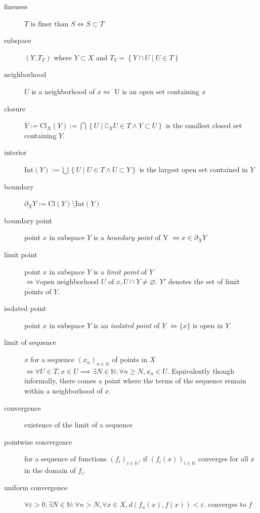 \documentclass[tbtags,columns=2]{cheatsheet}
\begin{document}
\begin{description}
    \item[fineness] $T\text{ is finer than }S \iff S \subset T$
    \item[subspace] $(Y,T_Y)$ where $Y\subset X$ and $T_Y = \left\{ Y \cap U \mid U \in T\right\}$
    \item[neighborhood] $U$ is a neighborhood of $x \iff$ U is an open set containing $x$
    \item[closure] $\overline{Y} := \mathrm{Cl}_X(Y) := \bigcap \left\{ U\mid \complement_{X}U\in T\land Y\subset U \right\}$ is the smallest closed set containing $Y$.
    \item[interior] $\mathrm{Int}(Y):=\bigcup \left\{ U\mid U\in T \land U\subset Y \right\}$ is the largest open set contained in $Y$
    \item[boundary] $\partial_X Y := \mathrm{Cl}(Y)\setminus \mathrm{Int}(Y)$ 
    \item[boundary point] point $x$ in subspace $Y$ is a \emph{boundary point} of Y $\iff x \in \partial_X Y$ 
    \item[limit point] point $x$ in subspace $Y$ is a \emph{limit point} of $Y$ $\iff \forall \text{open neighborhood $U$ of $x$},U\cap Y \ne \varnothing$. $Y'$ denotes the set of limit points of $Y$.
    \item[isolated point] point $x$ in subspace $Y$ is an \emph{isolated point} of $Y$ $\iff \{x\}$ is open in $Y$
    \item[limit of sequence] $x$ for a sequence $\left( x_{n} \right)_{n\in \mathbb{N}}$ of points in $X$ $\iff \forall U\in T,x \in U \implies \exists N\in \mathbb{N}:\forall n\geq N,  x_{n}\in U$. Equivalently though informally, there comes a point where the terms of the sequence remain within a neighborhood of $x$.
    \item[convergence] existence of the limit of a sequence
    \item[pointwise convergence] for a sequence of functions $\left( f_i \right)_{i\in \mathbb{N}}$, if $\left( f_i(x) \right)_{i\in \mathbb{N}}$ converges for all $x$ in the domain of $f_i$.
    \item[uniform convergence] $\forall\varepsilon>0, \exists N\in \mathbb{N}:\forall n > N, \forall x \in X, d\left( f_n(x),f(x) \right) < \varepsilon$. converges to $f$
\end{description}
\end{document}
